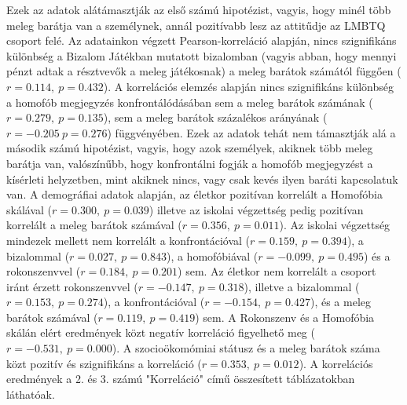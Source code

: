 Ezek az adatok alátámasztják az első számú hipotézist, vagyis, hogy minél több meleg barátja van a személynek, annál pozitívabb lesz az attitűdje az LMBTQ csoport felé.  Az adatainkon végzett Pearson-korreláció alapján, nincs szignifikáns különbség a Bizalom Játékban mutatott bizalomban (vagyis abban, hogy mennyi pénzt adtak a résztvevők a meleg játékosnak) a meleg barátok számától függően ($r=0.114, \ p=0.432$). A korrelációs elemzés alapján nincs szignifikáns különbség a  homofób megjegyzés konfrontálódásában sem a meleg barátok számának ($r=0.279, \ p=0.135$), sem a meleg barátok százalékos arányának ($r=-0.205 \ p=0.276$) függvényében. Ezek az adatok tehát nem támasztják alá a második számú hipotézist, vagyis, hogy azok személyek, akiknek több meleg barátja van, valószínűbb, hogy konfrontálni fogják a homofób megjegyzést a kísérleti helyzetben, mint akiknek nincs, vagy csak kevés ilyen baráti kapcsolatuk van. A demográfiai adatok alapján, az életkor pozitívan korrelált a Homofóbia skálával ($r=0.300, \  p=0.039$) illetve az iskolai végzettség pedig pozitívan korrelált a meleg barátok számával ($r=0.356, \  p=0.011$). Az iskolai végzettség mindezek mellett nem korrelált a konfrontációval ($r=0.159, \  p=0.394$), a bizalommal ($r=0.027, \  p=0.843$), a homofóbiával ($r=-0.099, \  p=0.495$) és a rokonszenvvel ($r=0.184, \  p=0.201$) sem. Az életkor nem korrelált a csoport iránt érzett rokonszenvvel ($r=-0.147, \ p=0.318$), illetve a bizalommal ($r=0.153, \  p=0.274$), a konfrontációval ($r=-0.154, \  p=0.427$), és a meleg barátok számával ($r=0.119, \  p=0.419$) sem. A Rokonszenv és a Homofóbia skálán elért eredmények közt negatív korreláció figyelhető meg ($r=-0.531, \  p=0.000$). A szocioökomómiai státusz és a meleg barátok száma közt pozitív és szignifikáns a korreláció ($r=0.353, \  p=0.012$). A korrelációs eredmények a 2. és 3. számú "Korreláció" című összesített táblázatokban láthatóak.
\\
\\
\\
\\
\\
\\
\\
\\
\\
\\
\\
\\
\\
\\
\\
\\
\\
\\
\\
\\
\\
